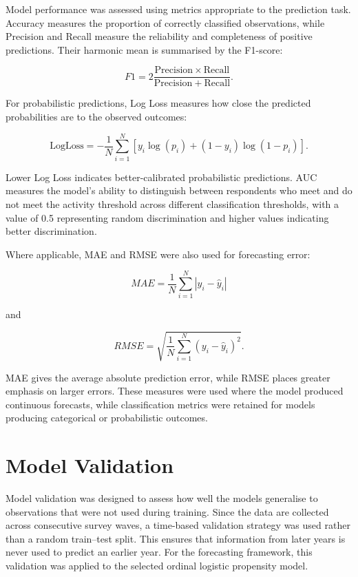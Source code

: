 \documentclass[ %
                    author={Ashrey Ashrey, Sanya Kapoor, Trisha Sharma, Yash Bhooshan Pandloskar},
                supervisor={Dr. Dalila O’Grady},
                    degree={MSc},
                     title={Using machine learning to forecast physical activity participation, volunteering and activity patterns in London},
                  subtitle={},
                      type={},
                      year={2021}]{dissertation}
\begin{document}
\noindent
Model performance was assessed using metrics appropriate to the prediction task. Accuracy measures the proportion of correctly classified observations, while Precision and Recall measure the reliability and completeness of positive predictions. Their harmonic mean is summarised by the F1-score:

\[
F1 = 2\frac{\mathrm{Precision}\times\mathrm{Recall}}
{\mathrm{Precision}+\mathrm{Recall}}.
\]

For probabilistic predictions, Log Loss measures how close the predicted probabilities are to the observed outcomes:

\[
\mathrm{LogLoss}
=
-\frac{1}{N}
\sum_{i=1}^{N}
\left[
y_i\log(p_i)
+
(1-y_i)\log(1-p_i)
\right].
\]

Lower Log Loss indicates better-calibrated probabilistic predictions. AUC measures the model's ability to distinguish between respondents who meet and do not meet the activity threshold across different classification thresholds, with a value of 0.5 representing random discrimination and higher values indicating better discrimination.

Where applicable, MAE and RMSE were also used for forecasting error:

\[
MAE =
\frac{1}{N}
\sum_{i=1}^{N}
\left|y_i-\widehat{y}_i\right|
\]

and

\[
RMSE =
\sqrt{
\frac{1}{N}
\sum_{i=1}^{N}
(y_i-\widehat{y}_i)^2
}.
\]

MAE gives the average absolute prediction error, while RMSE places greater emphasis on larger errors. These measures were used where the model produced continuous forecasts, while classification metrics were retained for models producing categorical or probabilistic outcomes.

\FloatBarrier
\section{Model Validation}

\noindent
Model validation was designed to assess how well the models generalise to observations that were not used during training. Since the data are collected across consecutive survey waves, a time-based validation strategy was used rather than a random train--test split. This ensures that information from later years is never used to predict an earlier year. For the forecasting framework, this validation was applied to the selected ordinal logistic propensity model.
\end{document}
